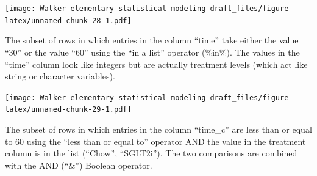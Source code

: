 \documentclass[]{book}
\newenvironment{Shaded}{\begin{snugshade}}{\end{snugshade}}
\newcommand{\DataTypeTok}[1]{\textcolor[rgb]{0.13,0.29,0.53}{#1}}
\newcommand{\DecValTok}[1]{\textcolor[rgb]{0.00,0.00,0.81}{#1}}
\newcommand{\ErrorTok}[1]{\textcolor[rgb]{0.64,0.00,0.00}{\textbf{#1}}}
\newcommand{\KeywordTok}[1]{\textcolor[rgb]{0.13,0.29,0.53}{\textbf{#1}}}
\newcommand{\NormalTok}[1]{#1}
\newcommand{\OperatorTok}[1]{\textcolor[rgb]{0.81,0.36,0.00}{\textbf{#1}}}
\newcommand{\StringTok}[1]{\textcolor[rgb]{0.31,0.60,0.02}{#1}}
\begin{document}
\texttt{[image: Walker-elementary-statistical-modeling-draft\_files/figure-latex/unnamed-chunk-28-1.pdf]}

The subset of rows in which entries in the column ``time'' take either the value ``30'' or the value ``60'' using the ``in a list'' operator (\%in\%). The values in the ``time'' column look like integers but are actually treatment levels (which act like string or character variables).

\begin{Shaded}
\end{Shaded}

\texttt{[image: Walker-elementary-statistical-modeling-draft\_files/figure-latex/unnamed-chunk-29-1.pdf]}

The subset of rows in which entries in the column ``time\_c'' are less than or equal to 60 using the ``less than or equal to'' operator AND the value in the treatment column is in the list (``Chow'', ``SGLT2i''). The two comparisons are combined with the AND (``\&'') Boolean operator.

\begin{Shaded}
\end{Shaded}
\end{document}
